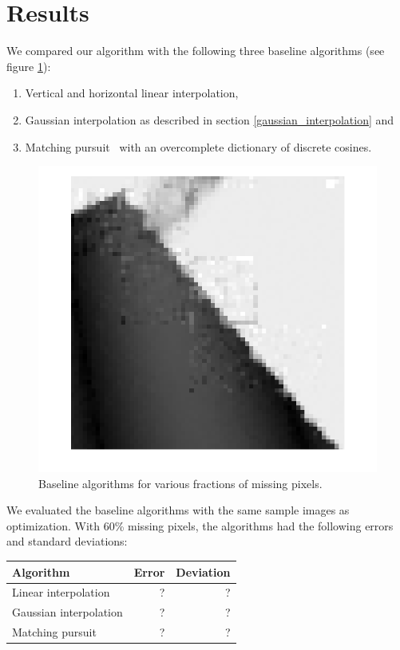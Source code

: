 \documentclass[10pt,conference,compsocconf]{IEEEtran}
\begin{document}
\section{Results}
We compared our algorithm with the following three baseline algorithms (see figure \ref{baseline_algorithms}):
\begin{enumerate}
\item Vertical and horizontal linear interpolation,
\item Gaussian interpolation as described in section \ref{gaussian_interpolation} and
\item Matching pursuit~\cite{matchingpursuit93} with an overcomplete dictionary of discrete cosines.
\end{enumerate}

\begin{figure}
\centering
\includegraphics[width=\columnwidth]{images/framing_artifacts.png}
\caption{Baseline algorithms for various fractions of missing pixels.}
\label{baseline_algorithms}
\end{figure}
 
We evaluated the baseline algorithms with the same sample images as optimization. With 60\% missing pixels, the algorithms had the following errors and standard deviations:

\begin{table}[h]
\centering
\begin{tabular}{l|r|r}
Algorithm & Error & Deviation \\
\hline
Linear interpolation & ? & ? \\
Gaussian interpolation & ? & ? \\
Matching pursuit & ? & ? \\
\end{tabular}
\end{table}
\end{document}
